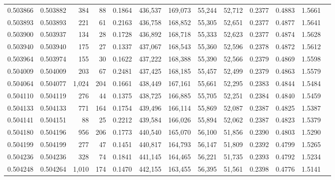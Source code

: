 \begin{tabular}{rrrrrrrrrrrrr}
0.503866 & 0.503882 &   384 &    88 &                                     0.1864 & 436,537 & 169,073 &  55,244 &  52,712 & 0.2377 & 0.4883 & 1.5661 \\
0.503893 & 0.503893 &   221 &    61 &                                     0.2163 & 436,758 & 168,852 &  55,305 &  52,651 & 0.2377 & 0.4877 & 1.5641 \\
0.503900 & 0.503937 &   134 &    28 &                                     0.1728 & 436,892 & 168,718 &  55,333 &  52,623 & 0.2377 & 0.4874 & 1.5628 \\
0.503940 & 0.503940 &   175 &    27 &                                     0.1337 & 437,067 & 168,543 &  55,360 &  52,596 & 0.2378 & 0.4872 & 1.5612 \\
0.503964 & 0.503974 &   155 &    30 &                                     0.1622 & 437,222 & 168,388 &  55,390 &  52,566 & 0.2379 & 0.4869 & 1.5598 \\
0.504009 & 0.504009 &   203 &    67 &                                     0.2481 & 437,425 & 168,185 &  55,457 &  52,499 & 0.2379 & 0.4863 & 1.5579 \\
0.504064 & 0.504077 & 1,024 &   204 &                                     0.1661 & 438,449 & 167,161 &  55,661 &  52,295 & 0.2383 & 0.4844 & 1.5484 \\
0.504110 & 0.504119 &   276 &    44 &                                     0.1375 & 438,725 & 166,885 &  55,705 &  52,251 & 0.2384 & 0.4840 & 1.5459 \\
0.504133 & 0.504133 &   771 &   164 &                                     0.1754 & 439,496 & 166,114 &  55,869 &  52,087 & 0.2387 & 0.4825 & 1.5387 \\
0.504141 & 0.504151 &    88 &    25 &                                     0.2212 & 439,584 & 166,026 &  55,894 &  52,062 & 0.2387 & 0.4823 & 1.5379 \\
0.504180 & 0.504196 &   956 &   206 &                                     0.1773 & 440,540 & 165,070 &  56,100 &  51,856 & 0.2390 & 0.4803 & 1.5290 \\
0.504199 & 0.504199 &   277 &    47 &                                     0.1451 & 440,817 & 164,793 &  56,147 &  51,809 & 0.2392 & 0.4799 & 1.5265 \\
0.504236 & 0.504236 &   328 &    74 &                                     0.1841 & 441,145 & 164,465 &  56,221 &  51,735 & 0.2393 & 0.4792 & 1.5234 \\
0.504248 & 0.504264 & 1,010 &   174 &                                     0.1470 & 442,155 & 163,455 &  56,395 &  51,561 & 0.2398 & 0.4776 & 1.5141 \\

\end{tabular}

